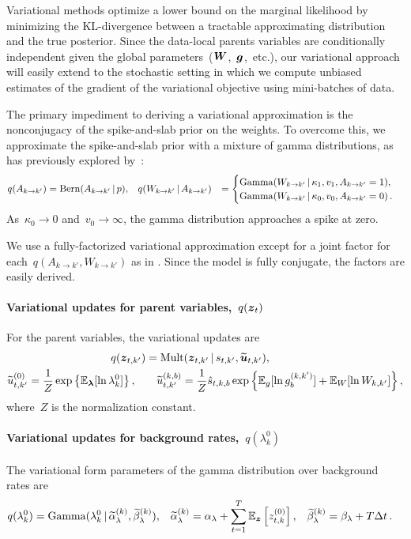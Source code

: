 Variational methods optimize a lower bound on the marginal likelihood by minimizing the KL-divergence between a tractable approximating distribution and the true posterior. Since the data-local parents variables are conditionally independent given the global parameters~($\boldsymbol{W}$,~$\boldsymbol{g}$,~etc.), our variational approach will easily extend to the stochastic setting in which we compute unbiased estimates of the gradient of the variational objective using mini-batches of data.

The primary impediment to deriving a variational approximation is the nonconjugacy of the spike-and-slab prior on the weights. 
To overcome this, we approximate the spike-and-slab prior with a mixture of gamma distributions, as has previously explored by~\citet{Grabska-2013}:
\begin{align*}
q(A_{k \to k'}) &= \mathrm{Bern}(A_{k \to k'} \,|\, p), &
q(W_{k \to k'} &\,|\, A_{k \to k'}) &=
\begin{cases} 
\mathrm{Gamma}(W_{k \to k'} \,|\, {\kappa}_1, {v}_1, A_{k \to k'} =1), \\
\mathrm{Gamma}(W_{k \to k'} \,|\, {\kappa}_0, {v}_0, A_{k \to k'} =0)\,.
\end{cases}
\end{align*}
As~$\kappa_0 \to 0$ and~$v_0\to \infty$, the gamma distribution approaches a spike at zero.

We use a fully-factorized variational approximation except for a joint factor for each~$q(A_{k\to k'}, W_{k \to k'})$ as in \citet{Lazaro-2011}.
Since the model is fully conjugate, the factors are easily derived. 
\paragraph{Variational updates for parent variables,~$q(\boldsymbol{z}_t)$} 
For the parent variables, the variational updates are
\begin{align*}
q(\boldsymbol{z}_{t,k'}) &= \mathrm{Mult}(\boldsymbol{z}_{t, k'} \,|\, s_{t,k'}, \widetilde{\boldsymbol{u}}_{t,k'}), \\
\widetilde{u}_{t,k'}^{(0)} = \frac{1}{Z} \exp\left\{\mathbb{E}_{\boldsymbol{\lambda}}[\ln \lambda_k^0]\right\}, \quad & \quad
\widetilde{u}_{t,k'}^{(k,b)} = \frac{1}{Z} \hat{s}_{t,k,b} \exp\left\{\mathbb{E}_g [\ln g_b^{(k,k')}] + \mathbb{E}_W[\ln W_{k,k'}]\right\},
\end{align*}
where~$Z$ is the normalization constant.

\paragraph{Variational updates for background rates,~$q(\lambda_k^0)$}
The variational form parameters of the gamma distribution over background rates are
\begin{align*}
q(\lambda_k^0) &= \mathrm{Gamma}(\lambda_k^{0} \,|\, \widetilde{\alpha}_{\lambda}^{(k)}, \widetilde{\beta}_{\lambda}^{(k)}),  &
\widetilde{\alpha}_{\lambda}^{(k)} &= \alpha_\lambda + \sum_{t=1}^T \mathbb{E}_{\boldsymbol{z}}\left[ z_{t,k}^{(0)}\right], &
\widetilde{\beta}_{\lambda}^{(k)} &= \beta_\lambda + T \Delta t\,.
\end{align*}


